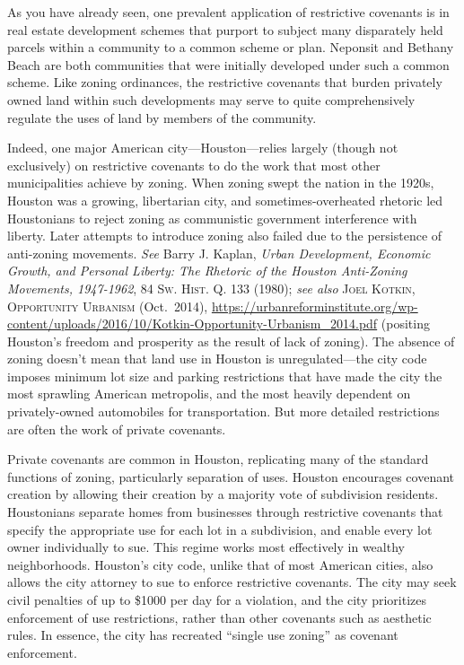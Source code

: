 As you have already seen, one prevalent application of restrictive covenants is
in real estate development schemes that purport to subject many disparately held
parcels within a community to a common scheme or plan. Neponsit and Bethany
Beach are both communities that were initially developed under such a common
scheme. Like zoning ordinances, the restrictive covenants that burden privately
owned land within such developments may serve to quite comprehensively regulate
the uses of land by members of the community.

Indeed, one major American city---Houston---relies largely (though not
exclusively) on restrictive covenants to do the work that most other
municipalities achieve by zoning. When zoning swept the nation in the 1920s,
Houston was a growing, libertarian city, and sometimes-overheated rhetoric led
Houstonians to reject zoning as communistic government interference with
liberty. Later attempts to introduce zoning also failed due to the persistence
of anti-zoning movements. \textit{See} Barry J. Kaplan, \textit{Urban
Development, Economic Growth, and Personal Liberty: The Rhetoric of the Houston
Anti-Zoning Movements, 1947-1962}, 84 \textsc{Sw. Hist. Q.} 133 (1980);
\textit{see also} \textsc{Joel Kotkin, Opportunity Urbanism} (Oct.~2014),
\url{https://urbanreforminstitute.org/wp-content/uploads/2016/10/Kotkin-Opportunity-Urbanism_2014.pdf}
(positing
Houston's freedom and prosperity as the result of lack of zoning). The absence
of zoning doesn't mean that land use in Houston is unregulated---the city code
imposes minimum lot size and parking restrictions that have made the city the
most sprawling American metropolis, and the most heavily dependent on
privately-owned automobiles for transportation. But more detailed restrictions
are often the work of private covenants.

Private covenants are common in Houston, replicating many of the standard
functions of zoning, particularly separation of uses. Houston encourages
covenant creation by allowing their creation by a majority vote of subdivision
residents. Houstonians separate homes from businesses through restrictive
covenants that specify the appropriate use for each lot in a subdivision, and
enable every lot owner individually to sue. This regime works most effectively
in wealthy neighborhoods. Houston's city code, unlike that of most American
cities, also allows the city attorney to sue to enforce restrictive covenants.
The city may seek civil penalties of up to \$1000 per day for a violation, and
the city prioritizes enforcement of use restrictions, rather than other
covenants such as aesthetic rules. In essence, the city has recreated ``single
use zoning'' as covenant enforcement.


